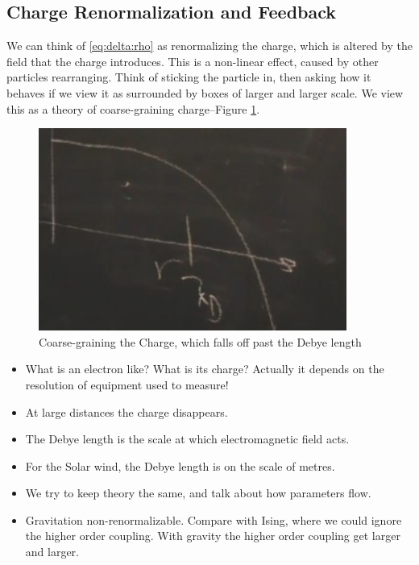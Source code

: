 \documentclass[]{article}
\begin{document}
\subsection{Charge Renormalization and Feedback}

We can think of \eqref{eq:delta:rho} as renormalizing the charge, which is altered by the field that the charge introduces. This is a non-linear effect, caused by other particles rearranging. Think of sticking the particle in, then asking how it behaves if we view it as surrounded by boxes of larger and larger scale. We view this as a theory of coarse-graining charge--Figure \ref{fig:coarse_grain_charge}.

\begin{figure}[H]
	\caption{Coarse-graining the Charge, which falls off past the Debye length}\label{fig:coarse_grain_charge}
	\includegraphics[width=0.9\textwidth]{coarse_grain_charge}
\end{figure}

\begin{itemize}
	\item What is an electron like? What is its charge? Actually it depends on the resolution of equipment used to measure! 
	\item At large distances the charge disappears. 
	\item The Debye length is the scale at which electromagnetic field acts.
	\item For the Solar wind, the Debye length is on the scale of metres.
	\item We try to keep theory the same, and talk about how parameters flow.
	\item Gravitation non-renormalizable. Compare with Ising, where we could ignore the higher order coupling. With gravity the higher order coupling get larger and larger.
\end{itemize}
\end{document}
